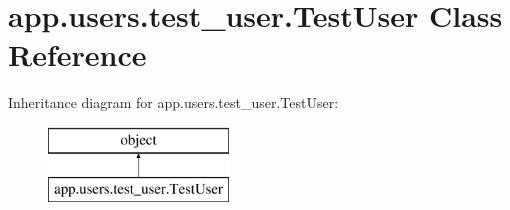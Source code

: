 \hypertarget{classapp_1_1users_1_1test__user_1_1_test_user}{}\section{app.\+users.\+test\+\_\+user.\+Test\+User Class Reference}
\label{classapp_1_1users_1_1test__user_1_1_test_user}
Inheritance diagram for app.\+users.\+test\+\_\+user.\+Test\+User\+:\begin{figure}[H]
\begin{center}
\leavevmode
\includegraphics[height=2.000000cm]{classapp_1_1users_1_1test__user_1_1_test_user}
\end{center}
\end{figure}
